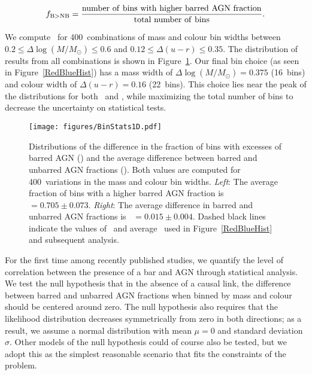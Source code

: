 \begin{equation}
f_{\rm{B>NB}}=\rm{\frac{number~of~bins~with~higher~barred~AGN~fraction}{total~number~of~bins}}.
\end{equation}

\noindent We compute \fb~for 400~combinations of mass and colour bin widths between $0.2 \le \Delta \log(M/M_{\odot}) \le 0.6$ and $0.12 \le \Delta (u-r) \le 0.35$. The distribution of results from all combinations is shown in Figure~\ref{BinStats}. Our final bin choice (as seen in Figure~\ref{RedBlueHist}) has a mass width of $\Delta \log(M/M_{\odot})=0.375$ (16~bins) and colour width of $\Delta (u-r)=0.16$ (22~bins). This choice lies near the peak of the distributions for both \fb~and \db, while maximizing the total number of bins to decrease the uncertainty on statistical tests. 

\begin{figure}
\centering
\texttt{[image: figures/BinStats1D.pdf]}
\caption{Distributions of the difference in the fraction of bins with excesses of barred AGN (\fb) and the average difference between barred and unbarred AGN fractions (\db). Both values are computed for 400~variations in the mass and colour bin widths. \textit{Left}: The average fraction of bins with a higher barred AGN fraction is \fb~$=0.705\pm0.073$. \textit{Right}: The average difference in barred and unbarred AGN fractions is \db~$=0.015\pm0.004$. Dashed black lines indicate the values of \fb~and average \db~used in Figure~\ref{RedBlueHist} and subsequent analysis.}
\label{BinStats}
\end{figure}


For the first time among recently published studies, we quantify the level of correlation between the presence of a bar and AGN through statistical analysis. We test the null hypothesis that in the absence of a causal link, the difference between barred and unbarred AGN fractions when binned by mass and colour should be centered around zero. The null hypothesis also requires that the likelihood distribution decreases symmetrically from zero in both directions; as a result, we assume a normal distribution with mean $\mu=0$ and standard deviation $\sigma$. Other models of the null hypothesis could of course also be tested, but we adopt this as the simplest reasonable scenario that fits the constraints of the problem. 

